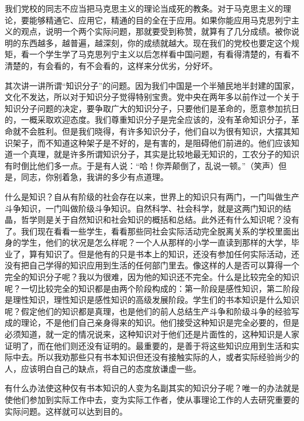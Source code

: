 我们党校的同志不应当把马克思主义的理论当成死的教条。对于马克思主义的理论，要能够精通它、应用它，精通的目的全在于应用。如果你能应用马克思列宁主义的观点，说明一个两个实际问题，那就要受到称赞，就算有了几分成绩。被你说明的东西越多，越普遍，越深刻，你的成绩就越大。现在我们的党校也要定这个规矩，看一个学生学了马克思列宁主义以后怎样看中国问题，有看得清楚的，有看不清楚的，有会看的，有不会看的，这样来分优劣，分好坏。

其次讲一讲所谓“知识分子”的问题。因为我们中国是一个半殖民地半封建的国家，文化不发达，所以对于知识分子觉得特别宝贵。党中央在两年多以前作过一个关于知识分子问题的决定，要争取广大的知识分子，只要他们是革命的，愿意参加抗日的，一概采取欢迎态度。我们尊重知识分子是完全应该的，没有革命知识分子，革命就不会胜利。但是我们晓得，有许多知识分子，他们自以为很有知识，大摆其知识架子，而不知道这种架子是不好的，是有害的，是阻碍他们前进的。他们应该知道一个真理，就是许多所谓知识分子，其实是比较地最无知识的，工农分子的知识有时倒比他们多一点。于是有人说：“哈！你弄颠倒了，乱说一顿。”（笑声）但是，同志，你别着急，我讲的多少有点道理。

什么是知识？自从有阶级的社会存在以来，世界上的知识只有两门，一门叫做生产斗争知识，一门叫做阶级斗争知识。自然科学、社会科学，就是这两门知识的结晶，哲学则是关于自然知识和社会知识的概括和总结。此外还有什么知识呢？没有了。我们现在看看一些学生，看看那些同社会实际活动完全脱离关系的学校里面出身的学生，他们的状况是怎么样呢？一个人从那样的小学一直读到那样的大学，毕业了，算有知识了。但是他有的只是书本上的知识，还没有参加任何实际活动，还没有把自己学得的知识应用到生活的任何部门里去。像这样的人是否可以算得一个完全的知识分子呢？我以为很难，因为他的知识还不完全。什么是比较完全的知识呢？一切比较完全的知识都是由两个阶段构成的：第一阶段是感性知识，第二阶段是理性知识，理性知识是感性知识的高级发展阶段。学生们的书本知识是什么知识呢？假定他们的知识都是真理，也是他们的前人总结生产斗争和阶级斗争的经验写成的理论，不是他们自己亲身得来的知识。他们接受这种知识是完全必要的，但是必须知道，就一定的情况说来，这种知识对于他们还是片面性的，这种知识是人家证明了，而在他们则还没有证明的。最重要的，是善于将这些知识应用到生活和实际中去。所以我劝那些只有书本知识但还没有接触实际的人，或者实际经验尚少的人，应该明白自己的缺点，将自己的态度放谦虚一些。

有什么办法使这种仅有书本知识的人变为名副其实的知识分子呢？唯一的办法就是使他们参加到实际工作中去，变为实际工作者，使从事理论工作的人去研究重要的实际问题。这样就可以达到目的。

